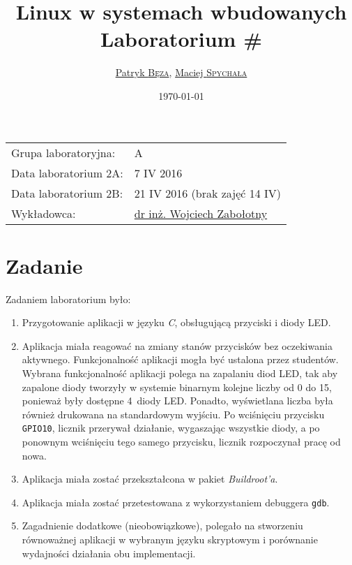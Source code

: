 \documentclass{article}
\title{Linux w systemach wbudowanych\\Laboratorium \#\labnumber}
\author{\href{mailto:bezap@student.mini.pw.edu.pl}{Patryk \textsc{Bęza}}, \href{mailto:spychalam@student.mini.pw.edu.pl}{Maciej \textsc{Spychała}}}
\date{\today}
\newcommand{\labnumber}{2}
\begin{document}
\maketitle

\begin{center}
\begin{tabular}{ll}
Grupa laboratoryjna: & A\\
Data laboratorium \labnumber A: & 7 IV 2016\\
Data laboratorium \labnumber B: & 21 IV 2016 (brak zajęć 14 IV)\\
Wykładowca: & \href{mailto:wzab@ise.pw.edu.pl}{dr inż. Wojciech Zabołotny}
\end{tabular}
\end{center}



\section{Zadanie}
\label{task}

Zadaniem laboratorium było:
\begin{enumerate}
\item Przygotowanie aplikacji w języku \emph{C}, obsługującą przyciski i diody LED.
\item Aplikacja miała reagować na zmiany stanów przycisków bez oczekiwania aktywnego. Funkcjonalność aplikacji mogła być ustalona przez studentów. Wybrana funkcjonalność aplikacji polega na zapalaniu diod LED, tak aby zapalone diody tworzyły w systemie binarnym kolejne liczby od 0 do 15, ponieważ były dostępne 4~diody LED. Ponadto, wyświetlana liczba była również drukowana na standardowym wyjściu. Po wciśnięciu przycisku \texttt{GPIO10}, licznik przerywał działanie, wygaszając wszystkie diody, a po ponownym wciśnięciu tego samego przycisku, licznik rozpoczynał pracę od nowa.
\item Aplikacja miała zostać przekształcona w pakiet \emph{Buildroot'a}.
\item Aplikacja miała zostać przetestowana z wykorzystaniem debuggera \texttt{gdb}.
\item Zagadnienie dodatkowe (nieobowiązkowe), polegało na stworzeniu równoważnej aplikacji w wybranym języku skryptowym i porównanie wydajności działania obu implementacji.
\end{enumerate}
\end{document}
